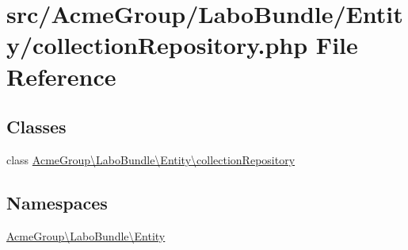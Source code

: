 \hypertarget{collection_repository_8php}{\section{src/\+Acme\+Group/\+Labo\+Bundle/\+Entity/collection\+Repository.php File Reference}
\label{collection_repository_8php}
}
\subsection*{Classes}
\begin{DoxyCompactItemize}
\item 
class \hyperlink{class_acme_group_1_1_labo_bundle_1_1_entity_1_1collection_repository}{Acme\+Group\textbackslash{}\+Labo\+Bundle\textbackslash{}\+Entity\textbackslash{}collection\+Repository}
\end{DoxyCompactItemize}
\subsection*{Namespaces}
\begin{DoxyCompactItemize}
\item 
 \hyperlink{namespace_acme_group_1_1_labo_bundle_1_1_entity}{Acme\+Group\textbackslash{}\+Labo\+Bundle\textbackslash{}\+Entity}
\end{DoxyCompactItemize}
